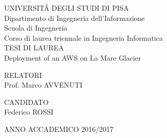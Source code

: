\begin{titlepage}
    \begin{center}
      UNIVERSIT\'{A} DEGLI STUDI DI PISA\\
      Dipartimento di Ingegneria dell'Informazione\\
      Scuola di Ingegneria\\
      Corso di laurea triennale in Ingegneria Informatica\\
      \vspace*{5\baselineskip}
      TESI DI LAUREA\\
      Deployment of an AWS on La Mare Glacier
      \vspace*{10\baselineskip}      
    \end{center}
    
    \begin{flushleft}
      RELATORI\\
      Prof. Marco AVVENUTI\\
    \end{flushleft}
    
    \begin{flushright}
      CANDIDATO\\
      Federico ROSSI
    \end{flushright}
    \vspace{\fill}
    \begin{center}
        ANNO ACCADEMICO 2016/2017
    \end{center}
\end{titlepage}